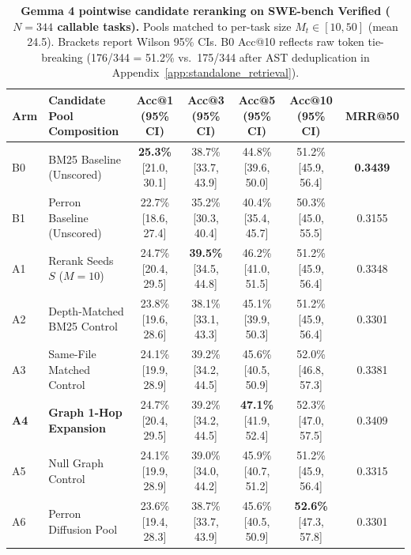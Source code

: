 \documentclass[10pt]{article}
\begin{document}
\begin{table}[!t]
\centering
\scriptsize
\setlength{\tabcolsep}{4.0pt}
\renewcommand{\arraystretch}{0.95}
\caption{\textbf{Gemma 4 pointwise candidate reranking on SWE-bench Verified ($N=344$ callable tasks).} Pools matched to per-task size $M_t \in [10, 50]$ (mean 24.5). Brackets report Wilson 95\% CIs. B0 Acc@10 reflects raw token tie-breaking (176/344 = 51.2\% vs.\ 175/344 after AST deduplication in Appendix~\ref{app:standalone_retrieval}).}
\label{tab:reranking_results}
\begin{tabular}{llccccc}
\toprule
\textbf{Arm} & \textbf{Candidate Pool Composition} & \textbf{Acc@1 (95\% CI)} & \textbf{Acc@3 (95\% CI)} & \textbf{Acc@5 (95\% CI)} & \textbf{Acc@10 (95\% CI)} & \textbf{MRR@50} \\
\midrule
B0 & BM25 Baseline (Unscored) & \textbf{25.3\%} [21.0, 30.1] & 38.7\% [33.7, 43.9] & 44.8\% [39.6, 50.0] & 51.2\% [45.9, 56.4] & \textbf{0.3439} \\
B1 & Perron Baseline (Unscored) & 22.7\% [18.6, 27.4] & 35.2\% [30.3, 40.4] & 40.4\% [35.4, 45.7] & 50.3\% [45.0, 55.5] & 0.3155 \\
\midrule
A1 & Rerank Seeds $S$ ($M=10$) & 24.7\% [20.4, 29.5] & \textbf{39.5\%} [34.5, 44.8] & 46.2\% [41.0, 51.5] & 51.2\% [45.9, 56.4] & 0.3348 \\
A2 & Depth-Matched BM25 Control & 23.8\% [19.6, 28.6] & 38.1\% [33.1, 43.3] & 45.1\% [39.9, 50.3] & 51.2\% [45.9, 56.4] & 0.3301 \\
A3 & Same-File Matched Control & 24.1\% [19.9, 28.9] & 39.2\% [34.2, 44.5] & 45.6\% [40.5, 50.9] & 52.0\% [46.8, 57.3] & 0.3381 \\
\textbf{A4} & \textbf{Graph 1-Hop Expansion} & 24.7\% [20.4, 29.5] & 39.2\% [34.2, 44.5] & \textbf{47.1\%} [41.9, 52.4] & 52.3\% [47.0, 57.5] & 0.3409 \\
A5 & Null Graph Control & 24.1\% [19.9, 28.9] & 39.0\% [34.0, 44.2] & 45.9\% [40.7, 51.2] & 51.2\% [45.9, 56.4] & 0.3315 \\
A6 & Perron Diffusion Pool & 23.6\% [19.4, 28.3] & 38.7\% [33.7, 43.9] & 45.6\% [40.5, 50.9] & \textbf{52.6\%} [47.3, 57.8] & 0.3301 \\
\bottomrule
\end{tabular}
\end{table}
\end{document}
